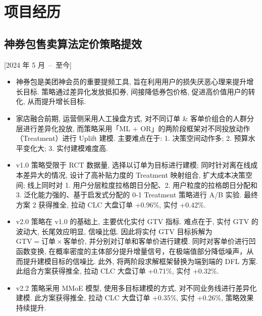 \documentclass{mycv}
\begin{document}




\section{项目经历}

\subsection{神券包售卖算法定价策略提效}[2024 年 5 月~--~至今]

\begin{itemize}
  \itemsep 0.4em
  \item 神券包是美团神会员的重要提频工具, 旨在利用用户的损失厌恶心理来提升增长目标. 策略通过差异化发放抵扣券, 间接降低券包价格, 促进高价值用户的转化, 从而提升增长目标.
  \item 家店融合前期, 运营侧采用人工操盘方式, 对不同订单 \& 客单价组合的人群分层进行差异化投放, 而策略采用「ML + OR」的两阶段框架对不同投放动作（Treatment）进行 Uplift 建模. 主要难点在于: 1. 决策空间动作多; 2. 预算水平变化大; 3. 实付建模难度高.
  \item v1.0 策略受限于 RCT 数据量, 选择以订单为目标进行建模; 同时针对离在线成本差异大的情况, 设计了高补贴力度的 Treatment 映射组合, 扩大成本决策空间; 线上同时对 1. 用户分层粒度拉格朗日分配、2. 用户粒度的拉格朗日分配和 3. 泛化能力强的、基于启发式分配的 0-1 Treatment 策略进行 A/B 实验. 最终方案 2 获得推全, 拉动 CLC 大盘订单 +0.96\%, 实付 +0.42\%.
  \item v2.0 策略在 v1.0 的基础上, 主要优化实付 GTV 指标. 难点在于, 实付 GTV 的波动大, 长尾效应明显, 信噪比低. 因此将实付 GTV 目标拆解为 $\text{GTV} = \text{订单} \times \text{客单价}$, 并分别对订单和客单价进行建模. 同时对客单价进行凹函数变换, 在概率密度的主体部分提升增量信号，在极端值部分降低噪声，从而提升建模目标的信噪比. 此外, 将两阶段求解框架替换为端到端的 DFL 方案. 此组合方案获得推全, 拉动 CLC 大盘订单 +0.71\%, 实付 +0.32\%.
  \item v2.2 策略采用 MMoE 模型, 使用多目标建模的方式, 对不同业务线进行差异化建模. 此方案获得推全, 拉动 CLC 大盘订单 +0.35\%, 实付 +0.26\%, 策略效果持续提升.
\end{itemize}
\end{document}
